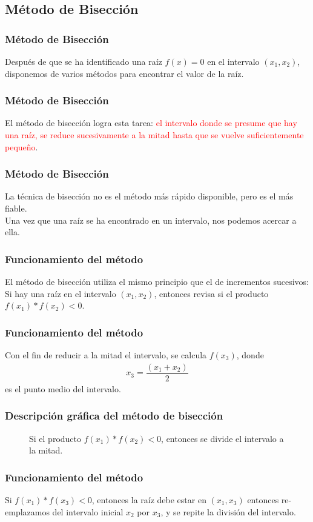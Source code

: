 \subsection{Método de Bisección}
\begin{frame}
\frametitle{Método de Bisección}
Después de que se ha identificado una raíz $f(x) = 0$ en el intervalo $(x_{1}, x_{2})$, disponemos de varios métodos para encontrar el valor de la raíz.
\end{frame}
\begin{frame}
\frametitle{Método de Bisección}
El método de bisección logra esta tarea: \textcolor{red}{el intervalo donde se presume que hay una raíz, se reduce sucesivamente a la mitad  hasta que se vuelve suficientemente pequeño}. 
\end{frame}
\begin{frame}
\frametitle{Método de Bisección}
La técnica de bisección no es el método más rápido disponible, pero es el más fiable.
\\
\bigskip
Una vez que una raíz se ha encontrado en un intervalo, nos podemos acercar a ella.
\end{frame}
\begin{frame}
\frametitle{Funcionamiento del método}
El método de bisección utiliza el mismo principio que el de incrementos sucesivos:
\\
\bigskip
Si hay una raíz en el intervalo $(x_{1}, x_{2})$, entonces revisa si el producto $f(x_{1})*f(x_{2}) < 0$.
\end{frame}
\begin{frame}
\frametitle{Funcionamiento del método}
Con el fin de reducir a la mitad el intervalo, se calcula $f(x_{3})$, donde
\begin{align*}
x_{3} = \dfrac{(x_{1} + x_{2})}{2}
\end{align*}
es el punto medio del intervalo.
\end{frame}
\begin{frame}
\frametitle{Descripción gráfica del método de bisección}
\begin{figure}
	\centering
	
	\caption{Si el producto $f(x_{1})*f(x_{2}) < 0$, entonces se divide el intervalo a la mitad.}
\end{figure}
\end{frame}
\begin{frame}
\frametitle{Funcionamiento del método}
Si $f(x_{1})*f(x_{3}) < 0$, entonces la raíz debe estar en $(x_{1}, x_{3})$ entonces re-emplazamos del intervalo inicial $x_{2}$ por $x_{3}$, y se repite la división del intervalo.
\pause
\begin{figure}
	\centering
	
\end{figure}
\end{frame}
